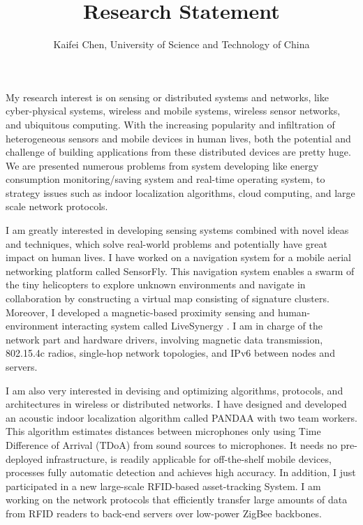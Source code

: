 \documentclass[a4paper, 12pt]{article}
\author{Kaifei Chen, University of Science and Technology of China}
\title{\textbf{Research Statement}}
\date{}
\begin{document}
\maketitle

My research interest is on sensing or distributed systems and networks, like cyber-physical systems, wireless and mobile systems, wireless sensor networks, and ubiquitous computing. With the increasing popularity and infiltration of heterogeneous sensors and mobile devices in human lives, both the potential and challenge of building applications from these distributed devices are pretty huge. We are presented numerous problems from system developing like energy consumption monitoring/saving system and real-time operating system, to strategy issues such as indoor localization algorithms, cloud computing, and large scale network protocols.


I am greatly interested in developing sensing systems combined with novel ideas and techniques, which solve real-world problems and potentially have great impact on human lives. I have worked on a navigation system for a mobile aerial networking platform called SensorFly. This navigation system enables a swarm of the tiny helicopters to explore unknown environments and navigate in collaboration by constructing a virtual map consisting of signature clusters. Moreover, I developed a magnetic-based proximity sensing and human-environment interacting system called LiveSynergy \cite{LiveSynergyDemo}. I am in charge of the network part and hardware drivers, involving magnetic data transmission, 802.15.4c radios, single-hop network topologies, and IPv6 between nodes and servers.


I am also very interested in devising and optimizing algorithms, protocols, and architectures in wireless or distributed networks. I have designed and developed an acoustic indoor localization algorithm called PANDAA \cite{PANDAA} with two team workers. This algorithm estimates distances between microphones only using Time Difference of Arrival (TDoA) from sound sources to microphones. It needs no pre-deployed infrastructure, is readily applicable for off-the-shelf mobile devices, processes fully automatic detection and achieves high accuracy. In addition, I just participated in a new large-scale RFID-based asset-tracking System. I am working on the network protocols that efficiently transfer large amounts of data from RFID readers to back-end servers over low-power ZigBee backbones.
\end{document}
